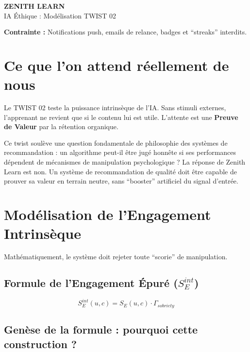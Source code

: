 \documentclass[11pt,a4paper]{article}
\begin{document}
\begin{tcolorbox}[enhanced, colback=BrandDark, colframe=BrandPrimary, arc=10pt, boxrule=2pt, halign=center]
    \vspace{0.3cm}
    {\Huge \bfseries \color{white} ZENITH LEARN} \\
    \vspace{0.2cm}
    {\Large \color{BrandPrimary} IA Éthique : Modélisation TWIST 02} \\
    \vspace{0.3cm}
\end{tcolorbox}

\begin{tcolorbox}[colback=BrandWarning!5, colframe=BrandWarning!20, arc=5pt]
    \textbf{Contrainte :} Notifications push, emails de relance, badges et ``streaks'' interdits.
\end{tcolorbox}

\section{Ce que l'on attend réellement de nous}
Le TWIST 02 teste la puissance intrinsèque de l'IA. Sans stimuli externes, l'apprenant ne revient que si le contenu lui est utile. L'attente est une \textbf{Preuve de Valeur} par la rétention organique.

Ce twist soulève une question fondamentale de philosophie des systèmes de recommandation : un algorithme peut-il être jugé honnête si ses performances dépendent de mécanismes de manipulation psychologique ? La réponse de Zenith Learn est non. Un système de recommandation de qualité doit être capable de prouver sa valeur en terrain neutre, sans ``booster'' artificiel du signal d'entrée.

\section{Modélisation de l'Engagement Intrinsèque}
Mathématiquement, le système doit rejeter toute ``scorie'' de manipulation.

\subsection{Formule de l'Engagement Épuré ($S_E^{int}$)}
\begin{equation}
S_E^{int}(u, c) = S_E(u, c) \cdot \Gamma_{sobriety}
\end{equation}

\subsection{Genèse de la formule : pourquoi cette construction ?}
\end{document}
